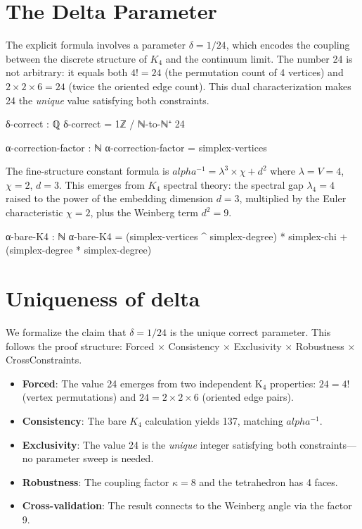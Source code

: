 \documentclass[11pt,a4paper]{book}
\def\alpha{alpha}%
\def\texorpdfstring#1#2{#2}%
\begin{document}
\section{The Delta Parameter}

The explicit formula involves a parameter $\delta = 1/24$, which encodes the coupling 
between the discrete structure of $K_4$ and the continuum limit. The number 24 is not 
arbitrary: it equals both $4! = 24$ (the permutation count of 4 vertices) and 
$2 \times 2 \times 6 = 24$ (twice the oriented edge count). This dual characterization 
makes 24 the \emph{unique} value satisfying both constraints.

\begin{code}
δ-correct : ℚ
δ-correct = 1ℤ / ℕ-to-ℕ⁺ 24

α-correction-factor : ℕ
α-correction-factor = simplex-vertices
\end{code}

The fine-structure constant formula is $\alpha^{-1} = \lambda^3 \times \chi + d^2$
where $\lambda = V = 4$, $\chi = 2$, $d = 3$. This emerges from $K_4$ spectral theory:
the spectral gap $\lambda_4 = 4$ raised to the power of the embedding dimension $d = 3$,
multiplied by the Euler characteristic $\chi = 2$, plus the Weinberg term $d^2 = 9$.

\begin{code}
α-bare-K4 : ℕ
α-bare-K4 = (simplex-vertices ^ simplex-degree) * simplex-chi + (simplex-degree * simplex-degree)
\end{code}

\section{Uniqueness of \texorpdfstring{$\delta$}{delta}}

We formalize the claim that $\delta = 1/24$ is the unique correct parameter. This follows 
the proof structure: Forced $\times$ Consistency $\times$ Exclusivity $\times$ Robustness 
$\times$ CrossConstraints.
\begin{itemize}
\item \textbf{Forced}: The value 24 emerges from two independent K$_4$ properties: 
  $24 = 4!$ (vertex permutations) and $24 = 2 \times 2 \times 6$ (oriented edge pairs).
\item \textbf{Consistency}: The bare $K_4$ calculation yields 137, matching $\alpha^{-1}$.
\item \textbf{Exclusivity}: The value 24 is the \emph{unique} integer satisfying both 
  constraints---no parameter sweep is needed.
\item \textbf{Robustness}: The coupling factor $\kappa = 8$ and the tetrahedron has 4 faces.
\item \textbf{Cross-validation}: The result connects to the Weinberg angle via the factor 9.
\end{itemize}
\end{document}
